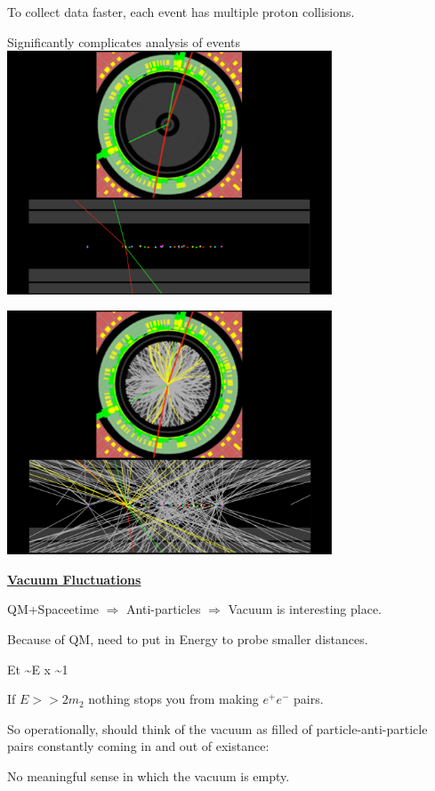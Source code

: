{To collect data faster, each event has multiple proton collisions.

Significantly complicates analysis of events
\bc
\includegraphics[width=0.725\textwidth]{./NoPileUp.pdf}
\ec


\bc
\includegraphics[width=0.725\textwidth]{./PileUp.pdf}
\ec

\clearpage

\underline{\textbf{Vacuum Fluctuations}}

QM+Spaceetime $\Rightarrow$ Anti-particles $\Rightarrow$ Vacuum is interesting place.

Because of QM, need to put in Energy to probe smaller distances.

\be
E\cdot t \sim E \cdot x \sim 1 \Rightarrow {} \Rightarrow {}
\ee

If $E >> 2m_2$ nothing stops you from making $e^+e^-$ pairs.

So operationally, should think of the vacuum as filled of particle-anti-particle pairs constantly coming in and out of existance:  

No meaningful sense in which the vacuum is empty.

}

